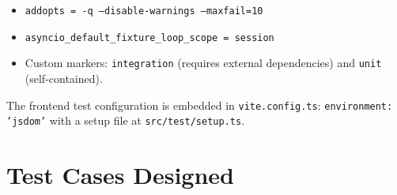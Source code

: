 \documentclass[12pt,a4paper]{report}
\begin{document}
\begin{itemize}[nosep]
    \item \texttt{addopts = -q --disable-warnings --maxfail=10}
    \item \texttt{asyncio\_default\_fixture\_loop\_scope = session}
    \item Custom markers: \texttt{integration} (requires external dependencies) and \texttt{unit} (self-contained).
\end{itemize}

The frontend test configuration is embedded in \texttt{vite.config.ts}: \texttt{environment: 'jsdom'} with a setup file at \texttt{src/test/setup.ts}.

\section{Test Cases Designed}
\end{document}
